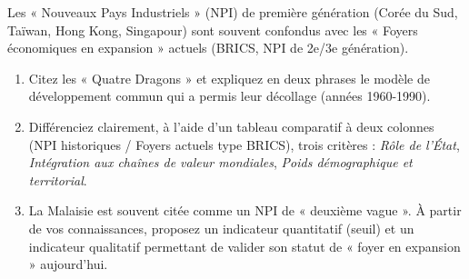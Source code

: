 \documentclass[11pt]{article}
\begin{document}
\begin{exercice}
Les « Nouveaux Pays Industriels » (NPI) de première génération (Corée du Sud, Taïwan, Hong Kong, Singapour) sont souvent confondus avec les « Foyers économiques en expansion » actuels (BRICS, NPI de 2e/3e génération).

\begin{enumerate}
    \item Citez les « Quatre Dragons » et expliquez en deux phrases le modèle de développement commun qui a permis leur décollage (années 1960-1990).
    \item Différenciez clairement, à l'aide d'un tableau comparatif à deux colonnes (NPI historiques / Foyers actuels type BRICS), trois critères : \textit{Rôle de l'État}, \textit{Intégration aux chaînes de valeur mondiales}, \textit{Poids démographique et territorial}.
    \item La Malaisie est souvent citée comme un NPI de « deuxième vague ». À partir de vos connaissances, proposez un indicateur quantitatif (seuil) et un indicateur qualitatif permettant de valider son statut de « foyer en expansion » aujourd'hui.
\end{enumerate}
\end{exercice}
\end{document}
